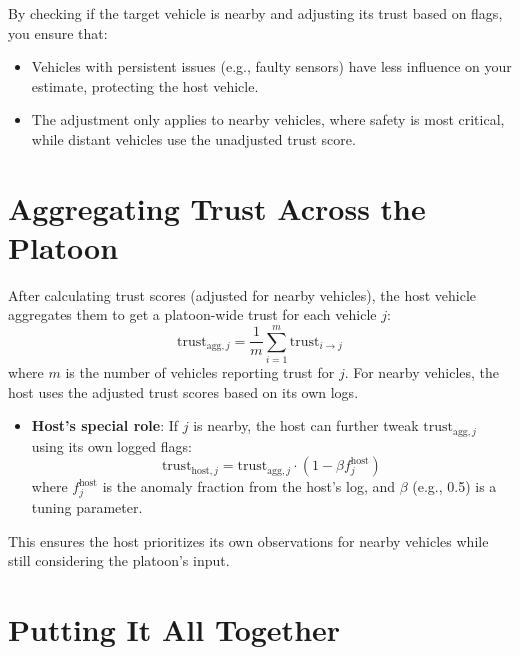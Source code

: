 \documentclass{article}
\begin{document}
By checking if the target vehicle is nearby and adjusting its trust based on flags, you ensure that:
\begin{itemize}
    \item Vehicles with persistent issues (e.g., faulty sensors) have less influence on your estimate, protecting the host vehicle.
    \item The adjustment only applies to nearby vehicles, where safety is most critical, while distant vehicles use the unadjusted trust score.
\end{itemize}

\section{Aggregating Trust Across the Platoon}

After calculating trust scores (adjusted for nearby vehicles), the host vehicle aggregates them to get a platoon-wide trust for each vehicle \( j \):
\[
\text{trust}_{\text{agg}, j} = \frac{1}{m} \sum_{i=1}^{m} \text{trust}_{i \to j}
\]
where \( m \) is the number of vehicles reporting trust for \( j \). For nearby vehicles, the host uses the adjusted trust scores based on its own logs.

\begin{itemize}
    \item \textbf{Host's special role}: If \( j \) is nearby, the host can further tweak \( \text{trust}_{\text{agg}, j} \) using its own logged flags:
    \[
    \text{trust}_{\text{host}, j} = \text{trust}_{\text{agg}, j} \cdot (1 - \beta f_j^{\text{host}})
    \]
    where \( f_j^{\text{host}} \) is the anomaly fraction from the host's log, and \( \beta \) (e.g., 0.5) is a tuning parameter.
\end{itemize}

This ensures the host prioritizes its own observations for nearby vehicles while still considering the platoon's input.

\section{Putting It All Together}
\end{document}
